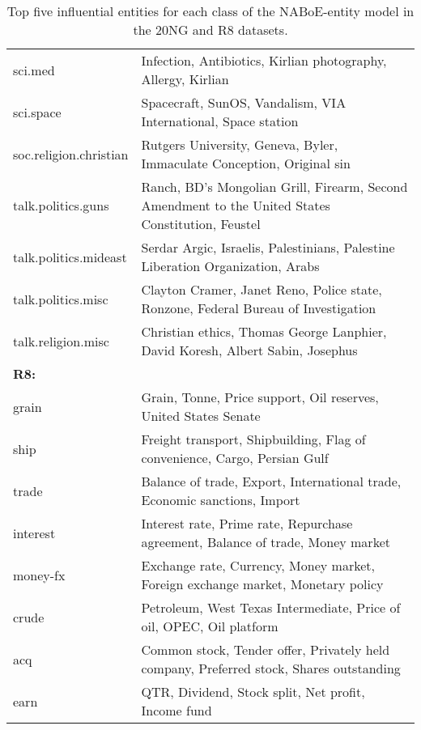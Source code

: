 \documentclass[11pt,a4paper]{article}
\begin{document}
\begin{table*}[!htb]
{\begin{tabular}{p{3.5cm}|p{12.1cm}}
            \small{sci.med                   } & \small{Infection, Antibiotics, Kirlian photography, Allergy, Kirlian}\\
            \small{sci.space                 } & \small{Spacecraft, SunOS, Vandalism, VIA International, Space station}\\
            \small{soc.religion.christian    } & \small{Rutgers University, Geneva, Byler, Immaculate Conception, Original sin}\\
            \small{talk.politics.guns        } & \small{Ranch, BD's Mongolian Grill, Firearm, Second Amendment to the United States Constitution, Feustel}\\
            \small{talk.politics.mideast     } & \small{Serdar Argic, Israelis, Palestinians, Palestine Liberation Organization, Arabs}\\
            \small{talk.politics.misc        } & \small{Clayton Cramer, Janet Reno, Police state, Ronzone, Federal Bureau of Investigation}\\
            \small{talk.religion.misc        } & \small{Christian ethics, Thomas George Lanphier, David Koresh, Albert Sabin, Josephus}\\

            \hline
            \small{\textbf{R8:}}\\
            \small{grain   } & \small{Grain, Tonne, Price support, Oil reserves, United States Senate}\\
            \small{ship    } & \small{Freight transport, Shipbuilding, Flag of convenience, Cargo, Persian Gulf}\\
            \small{trade   } & \small{Balance of trade, Export, International trade, Economic sanctions, Import}\\
            \small{interest} & \small{Interest rate, Prime rate, Repurchase agreement, Balance of trade, Money market}\\
            \small{money-fx} & \small{Exchange rate, Currency, Money market, Foreign exchange market, Monetary policy}\\
            \small{crude   } & \small{Petroleum, West Texas Intermediate, Price of oil, OPEC, Oil platform}\\
            \small{acq     } & \small{Common stock, Tender offer, Privately held company, Preferred stock, Shares outstanding}\\
            \small{earn    } & \small{QTR, Dividend, Stock split, Net profit, Income fund}\\
        \end{tabular}
        }
        \caption{Top five influential entities for each class of the NABoE-entity model in the 20NG and R8 datasets.}
        \label{tb:top-entities}
    \end{table*}
\end{document}
